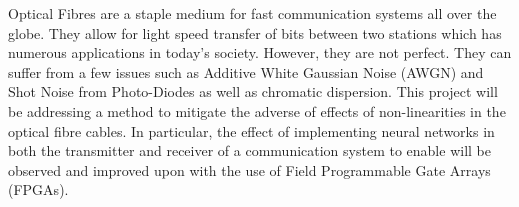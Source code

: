 
\iffalse
Think of the introduction as a development of the context for the reader.

Peruse the literature quickly. 
Highlight the historical progression of the theory and work that has been done, citing the literature as you go. 

Use the citation mechanisms in the editor you are using. 
After the reader has some idea of what the historical background is, mention what is missing in it that your proposal is going to fill.
\fi

Optical Fibres are a staple medium for fast communication systems all over the globe. They allow for light speed transfer of bits between two stations which has numerous applications in today's society. However, they are not perfect. They can suffer from a few issues such as Additive White Gaussian Noise (AWGN) and Shot Noise from Photo-Diodes as well as chromatic dispersion. This project will be addressing a method to mitigate the adverse of effects of non-linearities in the optical fibre cables. In particular, the effect of implementing neural networks in both the transmitter and receiver of a communication system to enable  will be observed and improved upon with the use of Field Programmable Gate Arrays (FPGAs).  
